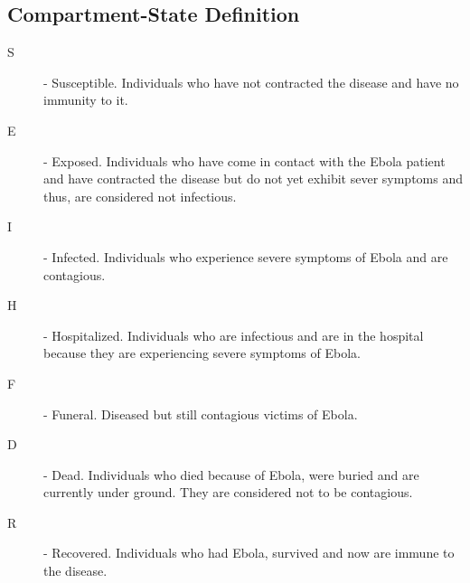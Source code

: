 \subsection{Compartment-State Definition}
\begin{description}
\item[S]- Susceptible. Individuals who have not contracted the disease and have no immunity to it. 
\item[E] - Exposed. Individuals who have come in contact with the Ebola patient and have contracted the disease but do not yet exhibit sever symptoms and thus, are considered not infectious.
\item[I] - Infected. Individuals who experience severe symptoms of Ebola and are contagious.
\item[H] - Hospitalized. Individuals who are infectious and are in the hospital because they are experiencing severe symptoms of Ebola.
\item[F] - Funeral. Diseased but still contagious victims of Ebola. 
\item[D] - Dead. Individuals who died because of Ebola, were buried and are currently under ground. They are considered not to be contagious.
\item[R] - Recovered. Individuals who had Ebola, survived and now are immune to the disease.
\end{description}

